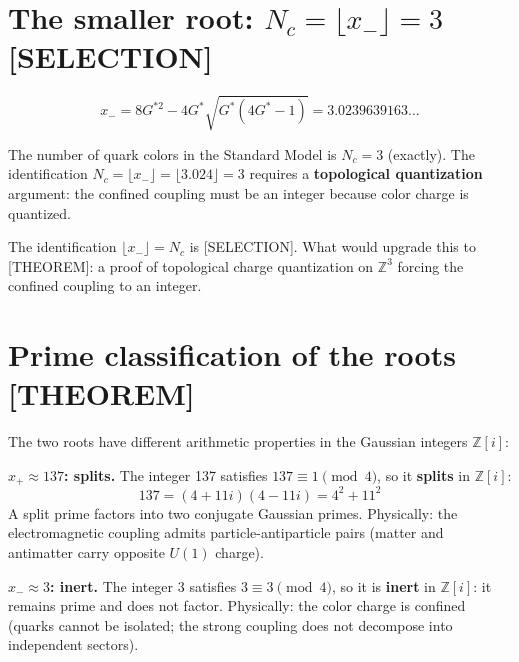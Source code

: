 \documentclass[
  11pt,
  letterpaper,
  twoside,
  openany]{book}
\makeatletter
\let\orig@section\section
\renewcommand{\section}{\needspace{8\baselineskip}\orig@section}
\newcommand{\Gs}{G^{*}{}}
\newcommand{\Gssq}{G^{*2}{}}      %
\makeatother
\begin{document}
\section{\texorpdfstring{The smaller root:
\(N_c = \lfloor x_- \rfloor = 3\)
{[}SELECTION{]}}{The smaller root: N\_c = \textbackslash lfloor x\_- \textbackslash rfloor = 3 {[}SELECTION{]}}}\label{the-smaller-root-n_c-lfloor-x_--rfloor-3-selection}

\[
x_- = 8\Gssq - 4\Gs\sqrt{\Gs(4\Gs - 1)} = 3.0239639163\ldots
\]

The number of quark colors in the Standard Model is \(N_c = 3\)
(exactly). The identification
\(N_c = \lfloor x_- \rfloor = \lfloor 3.024 \rfloor = 3\) requires a
\textbf{topological quantization} argument: the confined coupling must
be an integer because color charge is quantized.

\begin{ftdselection}

The identification \(\lfloor x_- \rfloor = N_c\) is {[}SELECTION{]}.
What would upgrade this to {[}THEOREM{]}: a proof of topological charge
quantization on \(\mathbb{Z}^3\) forcing the confined coupling to an
integer.

\end{ftdselection}

\section{Prime classification of the roots
{[}THEOREM{]}}\label{prime-classification-of-the-roots-theorem}

The two roots have different arithmetic properties in the Gaussian
integers \(\mathbb{Z}[i]\):

\textbf{\(x_+ \approx 137\): splits.} The integer 137 satisfies
\(137 \equiv 1 \pmod{4}\), so it \textbf{splits} in \(\mathbb{Z}[i]\):
\[
137 = (4 + 11i)(4 - 11i) = 4^2 + 11^2
\] A split prime factors into two conjugate Gaussian primes. Physically:
the electromagnetic coupling admits particle-antiparticle pairs (matter
and antimatter carry opposite \(U(1)\) charge).

\textbf{\(x_- \approx 3\): inert.} The integer 3 satisfies
\(3 \equiv 3 \pmod{4}\), so it is \textbf{inert} in \(\mathbb{Z}[i]\):
it remains prime and does not factor. Physically: the color charge is
confined (quarks cannot be isolated; the strong coupling does not
decompose into independent sectors).
\end{document}
